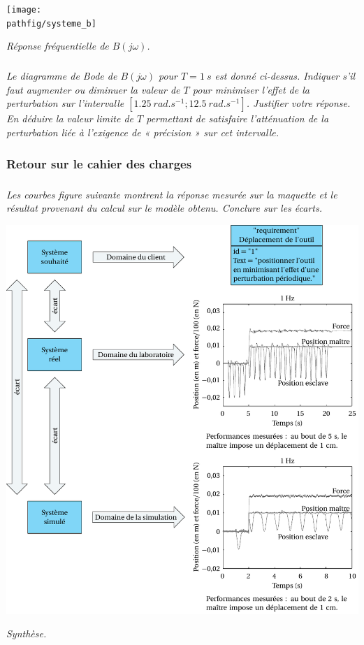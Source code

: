 \documentclass[10pt,fleqn]{article} %
\begin{document}
\begin{center}%

\texttt{[image: \\pathfig/systeme\_b]}

\textit{Réponse fréquentielle de $B(j\omega)$.
\label{chap2:tele:DR3}}
\end{center}

\subparagraph{}\textit{Le diagramme de Bode de $B(j \omega)$ pour $T = \SI{1}{s}$ est donné ci-dessus.
Indiquer s'il faut augmenter ou diminuer la valeur de $T$ pour minimiser l'effet de
la perturbation sur l'intervalle $[\SI{1,25}{rad.s^{-1}}; \SI{12,5}{rad.s^{-1}}]$. Justifier votre réponse. En déduire
la valeur limite de $T$ permettant de satisfaire l'atténuation de la perturbation liée à l'exigence
de « précision » sur cet intervalle.}


\subsubsection*{Retour sur le cahier des charges}


\subparagraph{}\textit{Les courbes figure suivante montrent la réponse mesurée sur la maquette et
le résultat provenant du calcul sur le modèle obtenu. Conclure sur les écarts.} 

\begin{center}
\includegraphics[width=.8\textwidth]{images2/bilan}

\textit{Synthèse.
\label{chap2:tele:DR4}}
\end{center}
\end{document}
